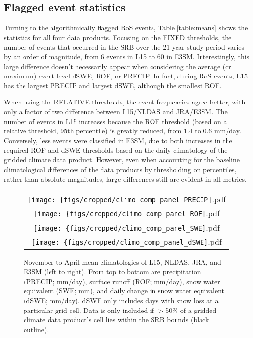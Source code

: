 \documentclass[draft]{agujournal2019}
\begin{document}
\subsection{Flagged event statistics}

Turning to the algorithmically flagged RoS events, Table \ref{table:means} shows the statistics for all four data products. 
Focusing on the FIXED thresholds, the number of events that occurred in the SRB over the 21-year study period varies by an order of magnitude, from 6 events in L15 to 60 in E3SM.
Interestingly, this large difference doesn't necessarily appear when considering the average (or maximum) event-level dSWE, ROF, or PRECIP. 
In fact, during RoS events, L15 has the largest PRECIP and largest dSWE, although the smallest ROF.

When using the RELATIVE thresholds, the event frequencies agree better, with only a factor of two difference between L15/NLDAS and JRA/E3SM. 
The number of events in L15 increases because the ROF threshold (based on a relative threshold, 95th percentile) is greatly reduced, from 1.4 to 0.6 mm/day. 
Conversely, less events were classified in E3SM, due to both increases in the required ROF and dSWE thresholds based on the daily climatology of the gridded climate data product. 
However, even when accounting for the baseline climatological differences of the data products by thresholding on percentiles, rather than absolute magnitudes, large differences still are evident in all metrics.

\begin{figure}
\begin{tabular}{c}
\texttt{[image: \{figs/cropped/climo\_comp\_panel\_PRECIP]}.pdf} \\
\texttt{[image: \{figs/cropped/climo\_comp\_panel\_ROF]}.pdf} \\
\texttt{[image: \{figs/cropped/climo\_comp\_panel\_SWE]}.pdf} \\
\texttt{[image: \{figs/cropped/climo\_comp\_panel\_dSWE]}.pdf}
\end{tabular}
\caption{November to April mean climatologies of L15, NLDAS, JRA, and E3SM (left to right). From top to bottom are precipitation (PRECIP; mm/day), surface runoff (ROF; mm/day), snow water equivalent (SWE; mm), and daily change in snow water equivalent (dSWE; mm/day). dSWE only includes days with snow loss at a particular grid cell. Data is only included if $>$50\% of a gridded climate data product's cell lies within the SRB bounds (black outline).}
\label{fig:means}
\end{figure}
\end{document}
